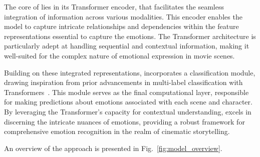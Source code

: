 The core of \modelname{} lies in its Transformer encoder, that facilitates the seamless integration of information across various modalities. This encoder enables the model to capture intricate relationships and dependencies within the feature representations essential to capture the emotions. The Transformer architecture is particularly adept at handling sequential and contextual information, making it well-suited for the complex nature of emotional expression in movie scenes.

Building on these integrated representations, \modelname{} incorporates a classification module, drawing inspiration from prior advancements in multi-label classification with Transformers~\cite{q2l}. This module serves as the final computational layer, responsible for making predictions about emotions associated with each scene and character. By leveraging the Transformer's capacity for contextual understanding, \modelname{} excels in discerning the intricate nuances of emotions, providing a robust framework for comprehensive emotion recognition in the realm of cinematic storytelling.

An overview of the approach is presented in Fig.~\ref{fig:model_overview}.
